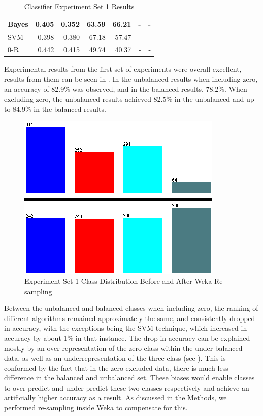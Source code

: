 \documentclass[../thesis/thesis.tex]{subfiles}
\begin{document}
\begin{table}
\begin{tabular}{|l|r|r|r|r|r|r|}
Bayes               & 0.405                                 & 0.352        & 63.59       & 66.21         & -           & -                                     \\ \hline
SVM                 & 0.398                                 & 0.380        & 67.18       & 57.47         & -           & -                                     \\ \hline
0-R                 & 0.442                                 & 0.415        & 49.74       & 40.37         & -           & -                                     \\ \hline
\end{tabular}
\caption{Classifier Experiment Set 1 Results}
\label{tab:results:set1}
\end{table}

Experimental results from the first set of experiments were overall excellent, results from them can be seen in . In the unbalanced results when including zero, an accuracy of 82.9\% was observed, and in the balanced results, 78.2\%.  When excluding zero, the unbalanced results achieved 82.5\% in the unbalanced and up to 84.9\% in the balanced results.

\begin{figure}
\centering
\includegraphics{../diagrams/temp/resample.png}
\caption{Experiment Set 1 Class Distribution Before and After Weka Re-sampling}
\label{fig:results:resample}
\end{figure}

Between the unbalanced and balanced classes when including zero, the ranking of different algorithms remained approximately the same, and consistently dropped in accuracy, with the exceptions being the SVM technique, which increased in accuracy by about 1\% in that instance. The drop in accuracy can be explained mostly by an over-representation of the zero class within the under-balanced data, as well as an underrepresentation of the three class (see ). This is conformed by the fact that in the zero-excluded data, there is much less difference in the balanced and unbalanced set. These biases would enable classes to over-predict and under-predict these two classes respectively and achieve an artificially higher accuracy as a result. As discussed in the Methods, we performed re-sampling inside Weka to compensate for this.
\end{document}

